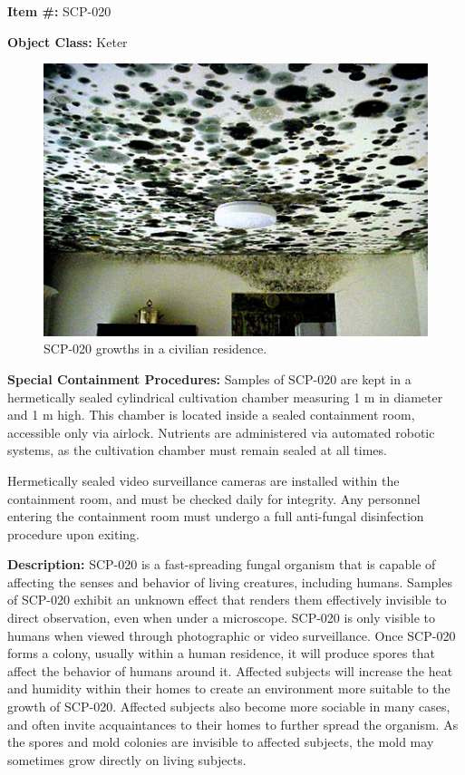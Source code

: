 
\textbf{Item \#:} SCP-020

\textbf{Object Class:} Keter

\begin{figure}[h]
\begin{center}
\includegraphics[scale=0.6]{scp/020a.jpg}
\linebreak SCP-020 growths in a civilian residence.
\end{center}
\end{figure}

\textbf{Special Containment Procedures:} Samples of SCP-020 are kept in a hermetically sealed cylindrical cultivation chamber measuring 1 m in diameter and 1 m high. This chamber is located inside a sealed containment room, accessible only via airlock. Nutrients are administered via automated robotic systems, as the cultivation chamber must remain sealed at all times.

Hermetically sealed video surveillance cameras are installed within the containment room, and must be checked daily for integrity. Any personnel entering the containment room must undergo a full anti-fungal disinfection procedure upon exiting.

\textbf{Description:} SCP-020 is a fast-spreading fungal organism that is capable of affecting the senses and behavior of living creatures, including humans. Samples of SCP-020 exhibit an unknown effect that renders them effectively invisible to direct observation, even when under a microscope. SCP-020 is only visible to humans when viewed through photographic or video surveillance.
\newpage
Once SCP-020 forms a colony, usually within a human residence, it will produce spores that affect the behavior of humans around it. Affected subjects will increase the heat and humidity within their homes to create an environment more suitable to the growth of SCP-020. Affected subjects also become more sociable in many cases, and often invite acquaintances to their homes to further spread the organism. As the spores and mold colonies are invisible to affected subjects, the mold may sometimes grow directly on living subjects.

